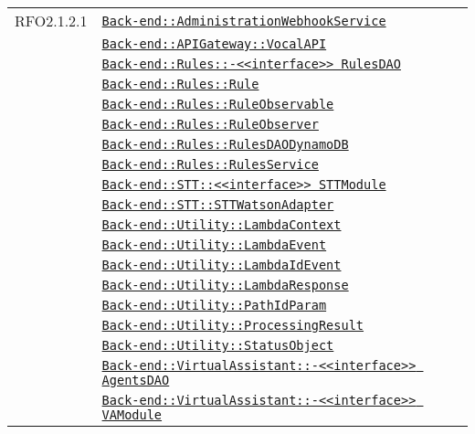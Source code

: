 \begin{longtable}{|>{\centering}m{3cm}|m{10cm}<{\centering}|}
RFO2.1.2.1 & \hyperref[Back-end::AdministrationWebhookService]{\texttt{Back-end::AdministrationWebhookService}}\\
& \hyperref[Back-end::APIGateway::VocalAPI]{\texttt{Back-end::APIGateway::VocalAPI}}\\
& \hyperref[Back-end::Rules::<<interface>> RulesDAO]{\texttt{Back-end::Rules::-\linebreak <<interface>> RulesDAO}}\\
& \hyperref[Back-end::Rules::Rule]{\texttt{Back-end::Rules::Rule}}\\
& \hyperref[Back-end::Rules::RuleObservable]{\texttt{Back-end::Rules::RuleObservable}}\\
& \hyperref[Back-end::Rules::RuleObserver]{\texttt{Back-end::Rules::RuleObserver}}\\
& \hyperref[Back-end::Rules::RulesDAODynamoDB]{\texttt{Back-end::Rules::RulesDAODynamoDB}}\\
& \hyperref[Back-end::Rules::RulesService]{\texttt{Back-end::Rules::RulesService}}\\
& \hyperref[Back-end::STT::<<interface>> STTModule]{\texttt{Back-end::STT::<<interface>> STTModule}}\\
& \hyperref[Back-end::STT::STTWatsonAdapter]{\texttt{Back-end::STT::STTWatsonAdapter}}\\
& \hyperref[Back-end::Utility::LambdaContext]{\texttt{Back-end::Utility::LambdaContext}}\\
& \hyperref[Back-end::Utility::LambdaEvent]{\texttt{Back-end::Utility::LambdaEvent}}\\
& \hyperref[Back-end::Utility::LambdaIdEvent]{\texttt{Back-end::Utility::LambdaIdEvent}}\\
& \hyperref[Back-end::Utility::LambdaResponse]{\texttt{Back-end::Utility::LambdaResponse}}\\
& \hyperref[Back-end::Utility::PathIdParam]{\texttt{Back-end::Utility::PathIdParam}}\\
& \hyperref[Back-end::Utility::ProcessingResult]{\texttt{Back-end::Utility::ProcessingResult}}\\
& \hyperref[Back-end::Utility::StatusObject]{\texttt{Back-end::Utility::StatusObject}}\\
& \hyperref[Back-end::VirtualAssistant::<<interface>> AgentsDAO]{\texttt{Back-end::VirtualAssistant::-\linebreak <<interface>> AgentsDAO}}\\
& \hyperref[Back-end::VirtualAssistant::<<interface>> VAModule]{\texttt{Back-end::VirtualAssistant::-\linebreak <<interface>> VAModule}}\\

\end{longtable}

